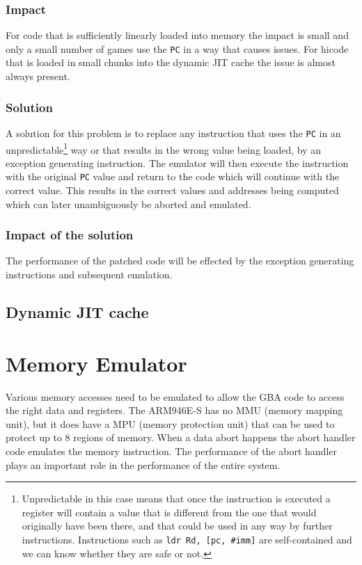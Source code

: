 \documentclass[a4paper,10pt]{report}
\begin{document}
	\subsection{Impact}
	For code that is sufficiently linearly loaded into memory the impact is small and only a small number of games use the \texttt{PC} in a way that causes issues. For hicode that is loaded in small chunks into the dynamic JIT cache the issue is almost always present.
	
	\subsection{Solution}
	A solution for this problem is to replace any instruction that uses the \texttt{PC} in an unpredictable\footnote{Unpredictable in this case means that once the instruction is executed a register will contain a value that is different from the one that would originally have been there, and that could be used in any way by further instructions. Instructions such as \texttt{ldr Rd, [pc, \#imm]} are self-contained and we can know whether they are safe or not.} way or that results in the wrong value being loaded, by an exception generating instruction. The emulator will then execute the instruction with the original \texttt{PC} value and return to the code which will continue with the correct value. This results in the correct values and addresses being computed which can later unambiguously be aborted and emulated.
	
	\subsection{Impact of the solution}
	The performance of the patched code will be effected by the exception generating instructions and subsequent emulation.
	
	\section{Dynamic JIT cache}
	
\chapter{Memory Emulator}\label{chap_mememu}
	Various memory accesses need to be emulated to allow the GBA code to access the right data and registers. The ARM946E-S has no MMU (memory mapping unit), but it does have a MPU (memory protection unit) that can be used to protect up to 8 regions of memory. When a data abort happens the abort handler code emulates the memory instruction. The performance of the abort handler plays an important role in the performance of the entire system.
\end{document}
